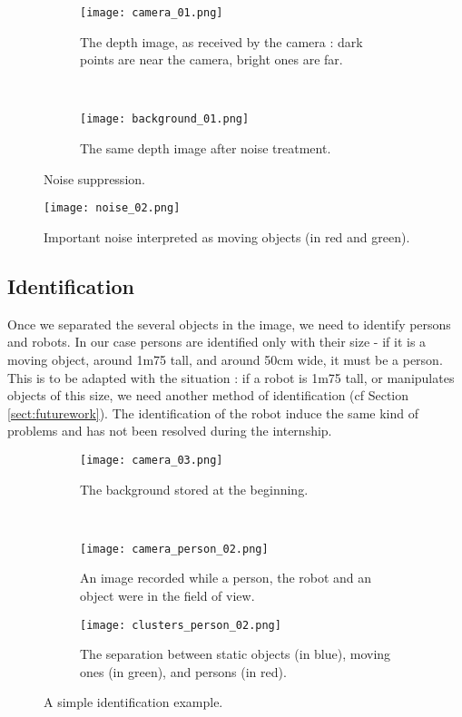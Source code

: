 \documentclass[smallextended]{svjour3}
\begin{document}
\begin{figure*}[t!]
    \centering
    \begin{subfigure}[t]{0.5\textwidth}
        \centering
        \texttt{[image: camera\_01.png]}
        \caption{\label{fig:camera1}The depth image, as received by the camera : dark points are near the camera, bright ones are far.}
    \end{subfigure}%
    ~ 
    \begin{subfigure}[t]{0.5\textwidth}
        \centering
        \texttt{[image: background\_01.png]}
        \caption{\label{fig:background1}The same depth image after noise treatment.}
    \end{subfigure}
    \caption{Noise suppression.}
\end{figure*}

\begin{figure}
\centering
\texttt{[image: noise\_02.png]}
\caption{\label{fig:noise}Important noise interpreted as moving objects (in red and green).}
\end{figure}

\subsection{Identification}

Once we separated the several objects in the image, we need to identify persons and robots. In our case persons are identified only with their size - if it is a moving object, around 1m75 tall, and around 50cm wide, it must be a person. This is to be adapted with the situation : if a robot is 1m75 tall, or manipulates objects of this size, we need another method of identification (cf Section \ref{sect:futurework}).
The identification of the robot induce the same kind of problems and has not been resolved during the internship.

\begin{figure*}[t!]
\centering

  \begin{subfigure}[t]{0.5\textwidth}
  \centering
  \texttt{[image: camera\_03.png]}
  \caption{\label{fig:background3}The background stored at the beginning.}
  \end{subfigure}%
  ~
  \begin{subfigure}[t]{0.5\textwidth}
  \centering
  \texttt{[image: camera\_person\_02.png]}
  \caption{\label{fig:cameraperson2}An image recorded while a person, the robot and an object were in the field of view.}
  \end{subfigure}

  \begin{subfigure}{0.5\textwidth}
  \centering
  \texttt{[image: clusters\_person\_02.png]}
  \caption{\label{fig:clustersperson2}The separation between static objects (in blue), moving ones (in green), and persons (in red).}
  \end{subfigure}
  \caption{A simple identification example.}

\end{figure*}
\end{document}

